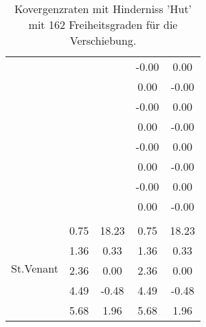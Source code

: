 \begin{table}
\begin{tabular}{c|cc|cc|}
\multicolumn{1}{|c|}{} & \multicolumn{1}{|c|}{} & \multicolumn{1}{|c|}{} & \multicolumn{1}{|c|}{     -0.00} & \multicolumn{1}{|c|}{      0.00} \\ 
\multicolumn{1}{|c|}{} & \multicolumn{1}{|c|}{} & \multicolumn{1}{|c|}{} & \multicolumn{1}{|c|}{      0.00} & \multicolumn{1}{|c|}{     -0.00} \\ 
\multicolumn{1}{|c|}{} & \multicolumn{1}{|c|}{} & \multicolumn{1}{|c|}{} & \multicolumn{1}{|c|}{     -0.00} & \multicolumn{1}{|c|}{      0.00} \\ 
\multicolumn{1}{|c|}{} & \multicolumn{1}{|c|}{} & \multicolumn{1}{|c|}{} & \multicolumn{1}{|c|}{      0.00} & \multicolumn{1}{|c|}{     -0.00} \\ 
\multicolumn{1}{|c|}{} & \multicolumn{1}{|c|}{} & \multicolumn{1}{|c|}{} & \multicolumn{1}{|c|}{     -0.00} & \multicolumn{1}{|c|}{      0.00} \\ 
\multicolumn{1}{|c|}{} & \multicolumn{1}{|c|}{} & \multicolumn{1}{|c|}{} & \multicolumn{1}{|c|}{      0.00} & \multicolumn{1}{|c|}{     -0.00} \\ 
\multicolumn{1}{|c|}{} & \multicolumn{1}{|c|}{} & \multicolumn{1}{|c|}{} & \multicolumn{1}{|c|}{     -0.00} & \multicolumn{1}{|c|}{      0.00} \\ 
\multicolumn{1}{|c|}{} & \multicolumn{1}{|c|}{} & \multicolumn{1}{|c|}{} & \multicolumn{1}{|c|}{      0.00} & \multicolumn{1}{|c|}{     -0.00} \\ 
\hline 
\multicolumn{1}{|c|}{\multirow{6}{*}{St.Venant}} &\multicolumn{1}{|c|}{} & \multicolumn{1}{|c|}{} & \multicolumn{1}{|c|}{} & \multicolumn{1}{|c|}{} \\ 
\multicolumn{1}{|c|}{} & \multicolumn{1}{|c|}{      0.75} & \multicolumn{1}{|c|}{     18.23} & \multicolumn{1}{|c|}{      0.75} & \multicolumn{1}{|c|}{     18.23} \\ 
\multicolumn{1}{|c|}{} & \multicolumn{1}{|c|}{      1.36} & \multicolumn{1}{|c|}{      0.33} & \multicolumn{1}{|c|}{      1.36} & \multicolumn{1}{|c|}{      0.33} \\ 
\multicolumn{1}{|c|}{} & \multicolumn{1}{|c|}{      2.36} & \multicolumn{1}{|c|}{      0.00} & \multicolumn{1}{|c|}{      2.36} & \multicolumn{1}{|c|}{      0.00} \\ 
\multicolumn{1}{|c|}{} & \multicolumn{1}{|c|}{      4.49} & \multicolumn{1}{|c|}{     -0.48} & \multicolumn{1}{|c|}{      4.49} & \multicolumn{1}{|c|}{     -0.48} \\ 
\multicolumn{1}{|c|}{} & \multicolumn{1}{|c|}{      5.68} & \multicolumn{1}{|c|}{      1.96} & \multicolumn{1}{|c|}{      5.68} & \multicolumn{1}{|c|}{      1.96} \\ 
\hline 
\end{tabular}\caption{Kovergenzraten mit Hinderniss 'Hut' mit 162 Freiheitsgraden für die Verschiebung.}\label{tab:Rate_Hut_level2}
\end{table} 
